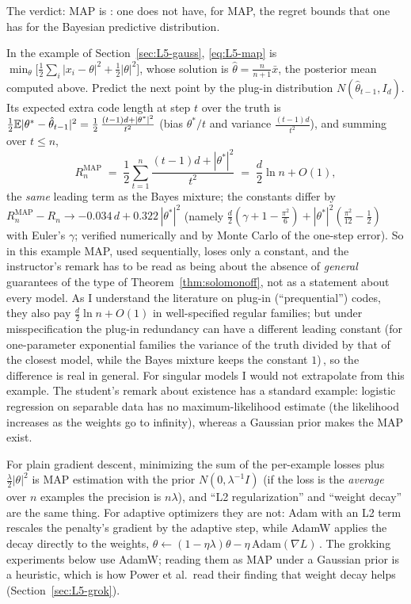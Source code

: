 The verdict: MAP is : one does not have, for MAP, the regret bounds that one has for the Bayesian predictive distribution.

\begin{beyond}
In the example of Section~\ref{sec:L5-gauss}, \eqref{eq:L5-map} is $\min_\theta\big[\frac12\sum_i|x_i-\theta|^2+\frac12|\theta|^2\big]$, whose solution is $\hat\theta=\frac n{n+1}\bar x$, the posterior mean computed above. Predict the next point by the plug-in distribution $N(\hat\theta_{t-1},I_d)$. Its expected extra code length at step $t$ over the truth is $\frac12\mathbb{E}|\theta^*-\hat\theta_{t-1}|^2=\frac12\,\frac{(t-1)d+|\theta^*|^2}{t^2}$ (bias $\theta^*/t$ and variance $\frac{(t-1)d}{t^2}$), and summing over $t\le n$,
\[
  R_n^{\mathrm{MAP}}\;=\;\frac12\sum_{t=1}^n\frac{(t-1)d+|\theta^*|^2}{t^2}\;=\;\frac d2\ln n+O(1),
\]
the \emph{same} leading term as the Bayes mixture; the constants differ by $R_n^{\mathrm{MAP}}-R_n\to-0.034\,d+0.322\,|\theta^*|^2$ (namely $\frac d2(\gamma+1-\frac{\pi^2}6)+|\theta^*|^2(\frac{\pi^2}{12}-\frac12)$ with Euler's $\gamma$; verified numerically and by Monte Carlo of the one-step error). So in this example MAP, used sequentially, loses only a constant, and the instructor's remark has to be read as being about the absence of \emph{general} guarantees of the type of Theorem~\ref{thm:solomonoff}, not as a statement about every model. As I understand the literature on plug-in (``prequential'') codes, they also pay $\frac d2\ln n+O(1)$ in well-specified regular families; but under misspecification the plug-in redundancy can have a different leading constant (for one-parameter exponential families the variance of the truth divided by that of the closest model, while the Bayes mixture keeps the constant $1$)\,\citep{grunwald2005}, so the difference is real in general. For singular models I would not extrapolate from this example. The student's remark about existence has a standard example: logistic regression on separable data has no maximum-likelihood estimate (the likelihood increases as the weights go to infinity), whereas a Gaussian prior makes the MAP exist.
\end{beyond}

\begin{beyond}
For plain gradient descent, minimizing the sum of the per-example losses plus $\frac\lambda2|\theta|^2$ is MAP estimation with the prior $N(0,\lambda^{-1}I)$ (if the loss is the \emph{average} over $n$ examples the precision is $n\lambda$), and ``L2 regularization'' and ``weight decay'' are the same thing. For adaptive optimizers they are not: Adam with an L2 term rescales the penalty's gradient by the adaptive step, while AdamW applies the decay directly to the weights, $\theta\leftarrow(1-\eta\lambda)\theta-\eta\,\mathrm{Adam}(\nabla L)$\,\citep{loshchilov2019}. The grokking experiments below use AdamW; reading them as MAP under a Gaussian prior is a heuristic, which is how Power et al.\ read their finding that weight decay helps (Section~\ref{sec:L5-grok}).
\end{beyond}

